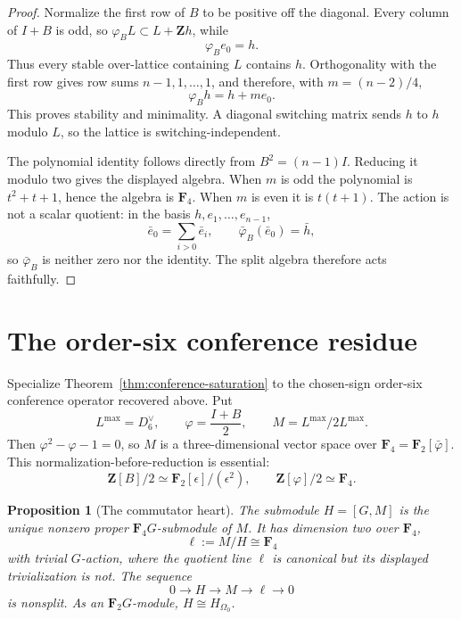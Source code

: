 \documentclass[11pt]{article}
\newtheorem{proposition}[theorem]{Proposition}
\theoremstyle{definition}
\theoremstyle{remark}
\newcommand{\F}{\mathbf F}
\newcommand{\Z}{\mathbf Z}
\begin{document}
\begin{proof}
Normalize the first row of \(B\) to be positive off the diagonal.  Every
column of \(I+B\) is odd, so \(\varphi_B L\subset L+\Z h\), while
\[
                         \varphi_Be_0=h.
\]
Thus every stable over-lattice containing \(L\) contains \(h\).  Orthogonality
with the first row gives row sums \(n-1,1,\ldots,1\), and therefore, with
\(m=(n-2)/4\),
\[
                         \varphi_Bh=h+me_0.
\]
This proves stability and minimality.  A diagonal switching matrix sends
\(h\) to \(h\) modulo \(L\), so the lattice is switching-independent.

The polynomial identity follows directly from \(B^2=(n-1)I\).  Reducing it
modulo two gives the displayed algebra.  When \(m\) is odd the polynomial is
\(t^2+t+1\), hence the algebra is \(\F_4\).  When \(m\) is even it is
\(t(t+1)\).  The action is not a scalar quotient: in the basis
\(h,e_1,\ldots,e_{n-1}\),
\[
 \bar e_0=\sum_{i>0}\bar e_i,\qquad
 \bar\varphi_B(\bar e_0)=\bar h,
\]
so \(\bar\varphi_B\) is neither zero nor the identity.  The split algebra
therefore acts faithfully.
\end{proof}

\section{The order-six conference residue}
\label{sec:conference-residue}

Specialize Theorem~\ref{thm:conference-saturation} to the chosen-sign
order-six conference operator recovered above.  Put
\[
 L^{\max}=D_6^\vee,\qquad \varphi=\frac{I+B}{2},\qquad
 M=L^{\max}/2L^{\max}.
\]
Then \(\varphi^2-\varphi-1=0\), so \(M\) is a three-dimensional vector space
over \(\F_4=\F_2[\bar\varphi]\).  This normalization-before-reduction is
essential:
\[
 \Z[B]/2\simeq\F_2[\epsilon]/(\epsilon^2),\qquad
 \Z[\varphi]/2\simeq\F_4.
\]

\begin{proposition}[The commutator heart]
\label{prop:commutator-heart}
The submodule \(H=[G,M]\) is the unique nonzero proper
\(\F_4G\)-submodule of \(M\).  It has dimension two over \(\F_4\),
\[
                    \ell:=M/H\cong\F_4
\]
with trivial \(G\)-action, where the quotient line \(\ell\) is canonical but
its displayed trivialization is not.  The sequence
\[
 0\longrightarrow H\longrightarrow M\longrightarrow\ell\longrightarrow0
\]
is nonsplit.  As an \(\F_2G\)-module, \(H\cong H_{\Omega_0}\).
\end{proposition}
\end{document}
